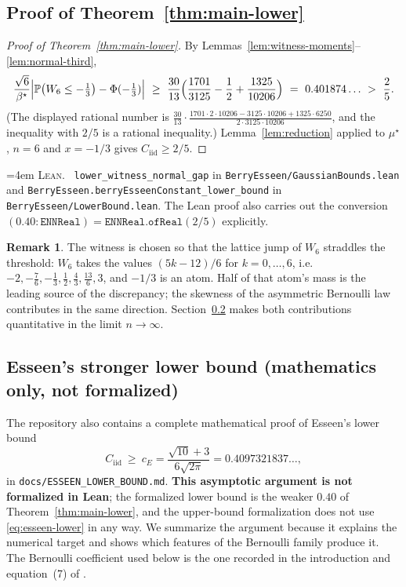 \documentclass[10pt,a4paper]{article}
\theoremstyle{plain}
\theoremstyle{definition}
\newtheorem{remark}[theorem]{Remark}
\newcommand{\PR}{\mathbb{P}}
\newcommand{\Cii}{C_{\mathrm{iid}}}
\newcommand{\lean}[1]{\texttt{#1}}
\newcommand{\file}[1]{\texttt{#1}}
\newenvironment{leanref}%
  {\par\addvspace{3pt}\begingroup\sloppy\emergencystretch=4em
   \noindent\footnotesize\textsc{Lean.}\ \ignorespaces}%
  {\par\endgroup\addvspace{3pt}}
\begin{document}
\subsection{Proof of Theorem~\ref{thm:main-lower}}

\begin{proof}[Proof of Theorem~\ref{thm:main-lower}]
By Lemmas~\ref{lem:witness-moments}--\ref{lem:normal-third},
\[
  \frac{\sqrt6}{\beta^\star}
  \Bigl|\PR\bigl(W_6\le-\tfrac13\bigr)-\Phi(-\tfrac13)\Bigr|
  \ \ge\ \frac{30}{13}\Bigl(\frac{1701}{3125}-\frac12+\frac{1325}{10206}\Bigr)
  \ =\ 0.401874\ldots \ >\ \frac25 .
\]
(The displayed rational number is
$\frac{30}{13}\cdot\frac{1701\cdot2\cdot10206 - 3125\cdot10206+1325\cdot6250}
{2\cdot3125\cdot10206}$, and the inequality with $2/5$ is a rational
inequality.) Lemma~\ref{lem:reduction} applied to $\mu^\star$, $n=6$ and
$x=-1/3$ gives $\Cii\ge2/5$.
\end{proof}

\begin{leanref}
\lean{lower\_witness\_normal\_gap} in \file{BerryEsseen/GaussianBounds.lean}
and \lean{BerryEsseen.berryEsseenConstant\_lower\_bound} in
\file{BerryEsseen/LowerBound.lean}. The Lean proof also carries out the
conversion $(0.40:\lean{ENNReal})=\lean{ENNReal.ofReal}(2/5)$ explicitly.
\end{leanref}

\begin{remark}
The witness is chosen so that the lattice jump of $W_6$ straddles the
threshold: $W_6$ takes the values $(5k-12)/6$ for $k=0,\dots,6$, i.e.\
$-2,-\tfrac76,-\tfrac13,\tfrac12,\tfrac43,\tfrac{13}{6},3$, and $-1/3$ is an
atom. Half of that atom's mass is the leading source of the discrepancy; the
skewness of the asymmetric Bernoulli law contributes in the same direction.
Section~\ref{sec:esseen-lower} makes both contributions quantitative in the
limit $n\to\infty$.
\end{remark}

\subsection{Esseen's stronger lower bound (mathematics only, not formalized)}
\label{sec:esseen-lower}

The repository also contains a complete mathematical proof of Esseen's lower
bound \cite{Esseen1956}
\begin{equation}\label{eq:esseen-lower}
  \Cii \ \ge\ c_E = \frac{\sqrt{10}+3}{6\sqrt{2\pi}} = 0.4097321837\ldots,
\end{equation}
in \file{docs/ESSEEN\_LOWER\_BOUND.md}. \textbf{This asymptotic argument is not
formalized in Lean}; the formalized lower bound is the weaker $0.40$ of
Theorem~\ref{thm:main-lower}, and the upper-bound formalization does not use
\eqref{eq:esseen-lower} in any way. We summarize the argument because it
explains the numerical target and shows which features of the Bernoulli family
produce it. The Bernoulli coefficient used below is the one recorded in the
introduction and equation~(7) of \cite{Zolotukhin2018}.
\end{document}
